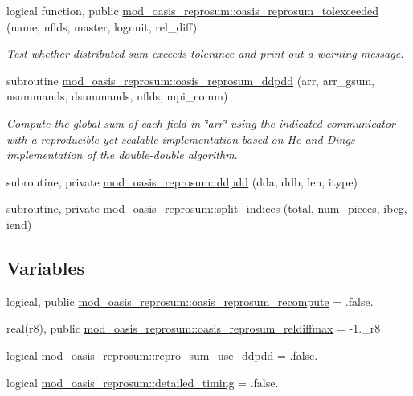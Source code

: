 \begin{DoxyCompactItemize}
logical function, public \hyperlink{namespacemod__oasis__reprosum_a0f773341a7a6883b2f65d395a6b25b08}{mod\+\_\+oasis\+\_\+reprosum\+::oasis\+\_\+reprosum\+\_\+tolexceeded} (name, nflds, master, logunit, rel\+\_\+diff)
\begin{DoxyCompactList}\small\item\em Test whether distributed sum exceeds tolerance and print out a warning message. \end{DoxyCompactList}\item 
subroutine \hyperlink{namespacemod__oasis__reprosum_afe237975bf8e718f32523c3929911102}{mod\+\_\+oasis\+\_\+reprosum\+::oasis\+\_\+reprosum\+\_\+ddpdd} (arr, arr\+\_\+gsum, nsummands, dsummands, nflds, mpi\+\_\+comm)
\begin{DoxyCompactList}\small\item\em Compute the global sum of each field in \char`\"{}arr\char`\"{} using the indicated communicator with a reproducible yet scalable implementation based on He and Ding\textquotesingle{}s implementation of the double-\/double algorithm. \end{DoxyCompactList}\item 
subroutine, private \hyperlink{namespacemod__oasis__reprosum_a24f9efa3ca739811888206eaf71d4690}{mod\+\_\+oasis\+\_\+reprosum\+::ddpdd} (dda, ddb, len, itype)
\item 
subroutine, private \hyperlink{namespacemod__oasis__reprosum_affb09b4ec9b001bf2ebbc51feebd8004}{mod\+\_\+oasis\+\_\+reprosum\+::split\+\_\+indices} (total, num\+\_\+pieces, ibeg, iend)
\end{DoxyCompactItemize}
\subsection*{Variables}
\begin{DoxyCompactItemize}
\item 
logical, public \hyperlink{namespacemod__oasis__reprosum_a89140c250e34a903bc9aa546574988d6}{mod\+\_\+oasis\+\_\+reprosum\+::oasis\+\_\+reprosum\+\_\+recompute} = .false.
\item 
real(r8), public \hyperlink{namespacemod__oasis__reprosum_a6a80f4226d35d0842617e6eb6c9406e1}{mod\+\_\+oasis\+\_\+reprosum\+::oasis\+\_\+reprosum\+\_\+reldiffmax} = -\/1.\+\_\+r8
\item 
logical \hyperlink{namespacemod__oasis__reprosum_aab06d0de9a82726d347ac52bb276355d}{mod\+\_\+oasis\+\_\+reprosum\+::repro\+\_\+sum\+\_\+use\+\_\+ddpdd} = .false.
\item 
logical \hyperlink{namespacemod__oasis__reprosum_a48a084c213295b9eaa78c0552a10741a}{mod\+\_\+oasis\+\_\+reprosum\+::detailed\+\_\+timing} = .false.
\end{DoxyCompactItemize}
